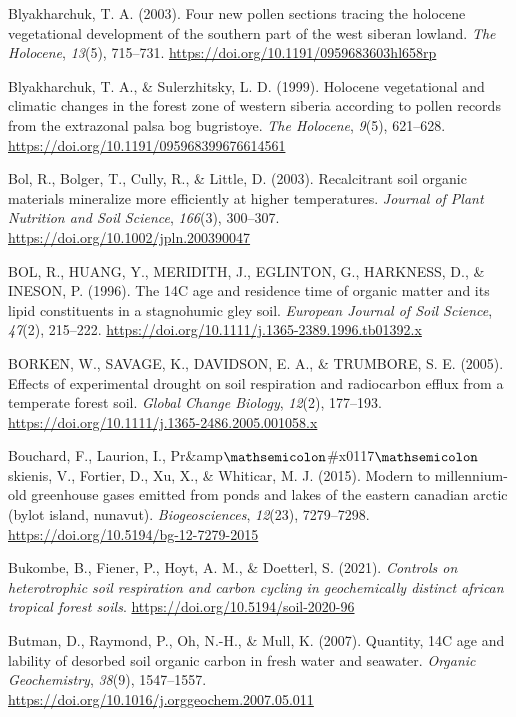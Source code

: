 \documentclass[]{article}
\begin{document}
\leavevmode\hypertarget{ref-Blyakharchuk_2003}{}%
Blyakharchuk, T. A. (2003). Four new pollen sections tracing the
holocene vegetational development of the southern part of the west
siberan lowland. \emph{The Holocene}, \emph{13}(5), 715--731.
\url{https://doi.org/10.1191/0959683603hl658rp}

\leavevmode\hypertarget{ref-Blyakharchuk_1999}{}%
Blyakharchuk, T. A., \& Sulerzhitsky, L. D. (1999). Holocene
vegetational and climatic changes in the forest zone of western siberia
according to pollen records from the extrazonal palsa bog bugristoye.
\emph{The Holocene}, \emph{9}(5), 621--628.
\url{https://doi.org/10.1191/095968399676614561}

\leavevmode\hypertarget{ref-Bol_2003}{}%
Bol, R., Bolger, T., Cully, R., \& Little, D. (2003). Recalcitrant soil
organic materials mineralize more efficiently at higher temperatures.
\emph{Journal of Plant Nutrition and Soil Science}, \emph{166}(3),
300--307. \url{https://doi.org/10.1002/jpln.200390047}

\leavevmode\hypertarget{ref-BOL_1996}{}%
BOL, R., HUANG, Y., MERIDITH, J., EGLINTON, G., HARKNESS, D., \& INESON,
P. (1996). The 14C age and residence time of organic matter and its
lipid constituents in a stagnohumic gley soil. \emph{European Journal of
Soil Science}, \emph{47}(2), 215--222.
\url{https://doi.org/10.1111/j.1365-2389.1996.tb01392.x}

\leavevmode\hypertarget{ref-BORKEN_2005}{}%
BORKEN, W., SAVAGE, K., DAVIDSON, E. A., \& TRUMBORE, S. E. (2005).
Effects of experimental drought on soil respiration and radiocarbon
efflux from a temperate forest soil. \emph{Global Change Biology},
\emph{12}(2), 177--193.
\url{https://doi.org/10.1111/j.1365-2486.2005.001058.x}

\leavevmode\hypertarget{ref-Bouchard_2015}{}%
Bouchard, F., Laurion, I.,
Pr\&amp\(\mathsemicolon\)\#x0117\(\mathsemicolon\)skienis, V., Fortier,
D., Xu, X., \& Whiticar, M. J. (2015). Modern to millennium-old
greenhouse gases emitted from ponds and lakes of the eastern canadian
arctic (bylot island, nunavut). \emph{Biogeosciences}, \emph{12}(23),
7279--7298. \url{https://doi.org/10.5194/bg-12-7279-2015}

\leavevmode\hypertarget{ref-Bukombe_2021}{}%
Bukombe, B., Fiener, P., Hoyt, A. M., \& Doetterl, S. (2021).
\emph{Controls on heterotrophic soil respiration and carbon cycling in
geochemically distinct african tropical forest soils}.
\url{https://doi.org/10.5194/soil-2020-96}

\leavevmode\hypertarget{ref-Butman_2007}{}%
Butman, D., Raymond, P., Oh, N.-H., \& Mull, K. (2007). Quantity, 14C
age and lability of desorbed soil organic carbon in fresh water and
seawater. \emph{Organic Geochemistry}, \emph{38}(9), 1547--1557.
\url{https://doi.org/10.1016/j.orggeochem.2007.05.011}
\end{document}
